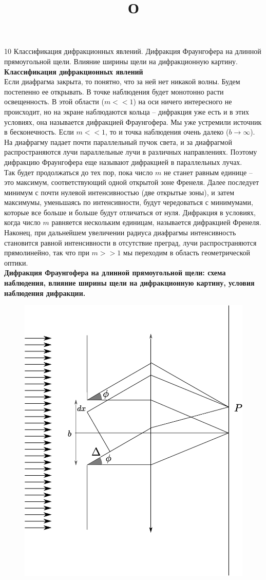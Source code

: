\documentclass[__main__.tex]{subfiles}
\begin{document}
\title{О}{10}
Классификация дифракционных явлений. Дифракция Фраунгофера на длинной прямоугольной щели. Влияние ширины щели на дифракционную картину.\\ 


\textbf{Классификация дифракционных явлений}\\

Если диафрагма закрыта, то понятно, что за ней нет никакой волны. Будем постепенно ее открывать. В точке наблюдения будет монотонно расти освещенность. В этой области ($m << 1$) на оси ничего интересного не происходит, но на экране наблюдаются кольца – дифракция уже есть и в этих условиях, она называется дифракцией Фраунгофера.
Мы уже устремили источник в бесконечность. Если $m << 1$,
то и точка наблюдения очень далеко ($b \rightarrow \infty$). На диафрагму падает почти параллельный пучок света, и за диафрагмой распространяются лучи параллельные лучи в различных направлениях. Поэтому дифракцию Фраунгофера еще называют дифракцией в параллельных лучах.\\
Так будет продолжаться до тех пор, пока число $m$ не станет равным единице – это максимум, соответствующий одной открытой зоне Френеля. Далее последует минимум с почти нулевой интенсивностью (две открытые зоны), и затем максимумы, уменьшаясь по интенсивности, будут чередоваться с минимумами, которые все больше и больше будут отличаться от нуля. Дифракция в условиях, когда число $m$ равняется нескольким единицам, называется дифракцией Френеля.
Наконец, при дальнейшем увеличении радиуса диафрагмы интенсивность становится равной интенсивности в отсутствие преград, лучи распространяются прямолинейно, так что при $m >> 1$ мы переходим в область геометрической
оптики.\\

\textbf{Дифракция Фраунгофера на длинной прямоугольной щели: схема наблюдения, влияние ширины щели на дифракционную картину, условия наблюдения дифракции.}\\

\begin{figure}[h]
	\begin{center}
		\includegraphics[width=0.5\linewidth]{img/o-08_3.eps}
	\end{center}
\end{figure}
\end{document}
